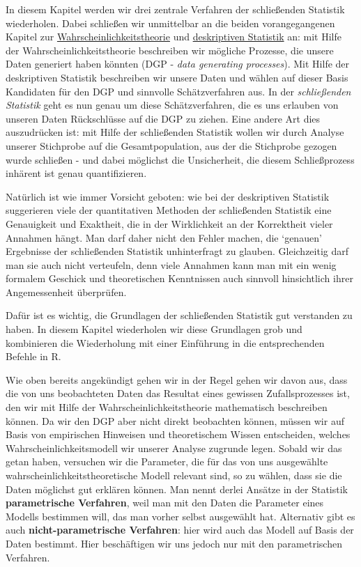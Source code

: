 \documentclass[]{book}
\begin{document}
In diesem Kapitel werden wir drei zentrale Verfahren der schließenden
Statistik wiederholen. Dabei schließen wir unmittelbar an die beiden
vorangegangenen Kapitel zur
\protect\hyperlink{stat-stoch}{Wahrscheinlichkeitstheorie} und
\protect\hyperlink{desk-stat}{deskriptiven Statistik} an: mit Hilfe der
Wahrscheinlichkeitstheorie beschreiben wir mögliche Prozesse, die unsere
Daten generiert haben könnten (DGP - \emph{data generating processes}).
Mit Hilfe der deskriptiven Statistik beschreiben wir unsere Daten und
wählen auf dieser Basis Kandidaten für den DGP und sinnvolle
Schätzverfahren aus. In der \emph{schließenden Statistik} geht es nun
genau um diese Schätzverfahren, die es uns erlauben von unseren Daten
Rückschlüsse auf die DGP zu ziehen. Eine andere Art dies auszudrücken
ist: mit Hilfe der schließenden Statistik wollen wir durch Analyse
unserer Stichprobe auf die Gesamtpopulation, aus der die Stichprobe
gezogen wurde schließen - und dabei möglichst die Unsicherheit, die
diesem Schließprozess inhärent ist genau quantifizieren.

Natürlich ist wie immer Vorsicht geboten: wie bei der deskriptiven
Statistik suggerieren viele der quantitativen Methoden der schließenden
Statistik eine Genauigkeit und Exaktheit, die in der Wirklichkeit an der
Korrektheit vieler Annahmen hängt. Man darf daher nicht den Fehler
machen, die `genauen' Ergebnisse der schließenden Statistik
unhinterfragt zu glauben. Gleichzeitig darf man sie auch nicht
verteufeln, denn viele Annahmen kann man mit ein wenig formalem Geschick
und theoretischen Kenntnissen auch sinnvoll hinsichtlich ihrer
Angemessenheit überprüfen.

Dafür ist es wichtig, die Grundlagen der schließenden Statistik gut
verstanden zu haben. In diesem Kapitel wiederholen wir diese Grundlagen
grob und kombinieren die Wiederholung mit einer Einführung in die
entsprechenden Befehle in R.

Wie oben bereits angekündigt gehen wir in der Regel gehen wir davon aus,
dass die von uns beobachteten Daten das Resultat eines gewissen
Zufallsprozesses ist, den wir mit Hilfe der Wahrscheinlichkeitstheorie
mathematisch beschreiben können. Da wir den DGP aber nicht direkt
beobachten können, müssen wir auf Basis von empirischen Hinweisen und
theoretischem Wissen entscheiden, welches Wahrscheinlichkeitsmodell wir
unserer Analyse zugrunde legen. Sobald wir das getan haben, versuchen
wir die Parameter, die für das von uns ausgewählte
wahrscheinlichkeitstheoretische Modell relevant sind, so zu wählen, dass
sie die Daten möglichst gut erklären können. Man nennt derlei Ansätze in
der Statistik \textbf{parametrische Verfahren}, weil man mit den Daten
die Parameter eines Modells bestimmen will, das man vorher selbst
ausgewählt hat. Alternativ gibt es auch \textbf{nicht-parametrische
Verfahren}: hier wird auch das Modell auf Basis der Daten bestimmt. Hier
beschäftigen wir uns jedoch nur mit den parametrischen Verfahren.
\end{document}
